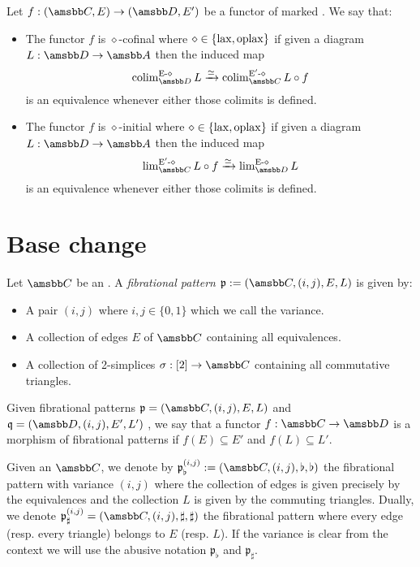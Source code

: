 \documentclass[10pt,a4paper]{amsart}
\begin{document}
 \begin{defn}
   Let $f:(\tC,E) \to (\tD,E')$ be a functor of marked \itcat{}. We say that:
   \begin{itemize}
     \item The functor $f$ is $\diamond$-cofinal where $\diamond \in \{\text{\textup{lax}},\text{\textup{oplax}}\}$ if given a diagram $L:\tD \to \tA$ then the induced map
     \[
       \colim_{\tD}^{\text{E}\text{-}\diamond} L \xrightarrow{\simeq} \colim_{\tC}^{\text{E}'\text{-}\diamond} L \circ f
     \]
     is an equivalence whenever either those colimits is defined.
     \item  The functor $f$ is $\diamond$-initial where $\diamond \in \{\text{\textup{lax}},\text{\textup{oplax}}\}$ if given a diagram $L:\tD \to \tA$ then the induced map 
     \[
       \lim_{\tC}^{\text{E}'\text{-}\diamond} L \circ f \xrightarrow{\simeq} \lim_{\tD}^{\text{E}\text{-}\diamond} L
     \]
     is an equivalence whenever either those colimits is defined.
   \end{itemize}
 \end{defn}




 \section{Base change}
 \begin{defn}\label{def:fibpattern}
   Let $\tC$ be an \itcat{ }. A \emph{fibrational pattern} $\mathfrak{p}:=(\tC,(i,j),E,L)$ is given by:
   \begin{itemize}
     \item A pair $(i,j)$ where $i,j \in \{0,1\}$ which we call the variance.
     \item A collection of edges $E$ of $\tC$ containing all equivalences.
     \item A collection of 2-simplices $\sigma: [2]  \to \tC$ containing all commutative triangles. 
   \end{itemize}
   Given fibrational patterns $\mathfrak{p}=(\tC,(i,j),E,L)$ and $\mathfrak{q}=(\tD,(i,j),E',L')$ , we say that a functor $f: \tC \to \tD$ is a morphism of fibrational patterns if $f(E)\subseteq E'$ and $f(L)\subseteq L'$.
 \end{defn}



 \begin{ex}
   Given an \itcat{} $\tC$, we denote by $\mathfrak{p}^{(i,j)}_{\flat}:=(\tC,(i,j),\flat,\flat)$ the fibrational pattern with variance $(i,j)$ where the collection of edges is given precisely by the equivalences and the collection $L$ is given by the commuting triangles. Dually, we denote $\mathfrak{p}^{(i,j)}_{\sharp}=(\tC,(i,j),\sharp,\sharp)$ the fibrational pattern where every edge (resp. every triangle) belongs to $E$ (resp. $L$). If the variance is clear from the context we will use the abusive notation $\mathfrak{p}_\flat$ and $\mathfrak{p}_{\sharp}$.
 \end{ex}
\end{document}
